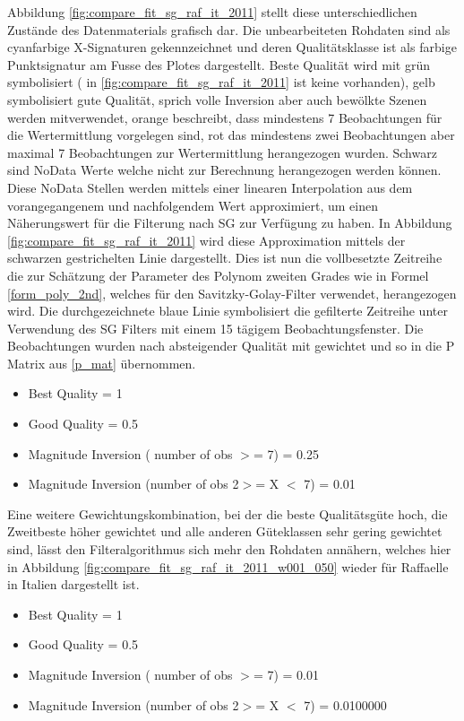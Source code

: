 \documentclass[11pt]{report}
\begin{document}
Abbildung \ref{fig:compare_fit_sg_raf_it_2011} stellt diese unterschiedlichen Zustände des Datenmaterials grafisch dar. Die unbearbeiteten Rohdaten sind als cyanfarbige X-Signaturen gekennzeichnet und deren Qualitätsklasse ist als farbige Punktsignatur am Fusse des Plotes dargestellt. Beste Qualität wird mit grün symbolisiert ( in \ref{fig:compare_fit_sg_raf_it_2011} ist keine vorhanden), gelb symbolisiert gute Qualität, sprich volle Inversion aber auch bewölkte Szenen werden mitverwendet,  orange beschreibt, dass mindestens 7 Beobachtungen für die Wertermittlung vorgelegen sind, rot das mindestens zwei Beobachtungen aber maximal 7 Beobachtungen zur Wertermittlung herangezogen wurden. Schwarz sind NoData Werte welche nicht zur Berechnung herangezogen werden können. Diese NoData Stellen werden mittels einer linearen Interpolation aus dem vorangegangenem und nachfolgendem Wert approximiert, um einen Näherungswert für die Filterung nach SG zur Verfügung zu haben. In Abbildung \ref{fig:compare_fit_sg_raf_it_2011} wird diese Approximation mittels der schwarzen gestrichelten Linie dargestellt. Dies ist nun die vollbesetzte Zeitreihe die zur Schätzung der Parameter des Polynom zweiten Grades wie in Formel \ref{form_poly_2nd}, welches für den Savitzky-Golay-Filter verwendet, herangezogen wird. Die durchgezeichnete blaue Linie symbolisiert die gefilterte Zeitreihe unter Verwendung des SG Filters mit einem 15 tägigem Beobachtungsfenster. Die Beobachtungen wurden nach absteigender Qualität mit gewichtet und so in die P Matrix aus \ref{p_mat} übernommen. 
\begin{itemize}
\item Best Quality = 1 
\item Good Quality = 0.5
\item Magnitude Inversion ( number of obs $>$= 7) = 0.25
\item Magnitude Inversion (number of obs 2$>$= X $<$ 7) = 0.01
\end{itemize}
Eine weitere Gewichtungskombination, bei der die beste Qualitätsgüte hoch, die Zweitbeste höher gewichtet und alle anderen Güteklassen sehr gering gewichtet sind, lässt den Filteralgorithmus sich mehr den Rohdaten annähern, welches hier in Abbildung \ref{fig:compare_fit_sg_raf_it_2011_w001_050} wieder für Raffaelle in Italien dargestellt ist. 
\begin{itemize}
\item Best Quality = 1 
\item Good Quality = 0.5
\item Magnitude Inversion ( number of obs $>$= 7) = 0.01
\item Magnitude Inversion (number of obs 2$>$= X $<$ 7) = 0.0100000
\end{itemize}
\end{document}
